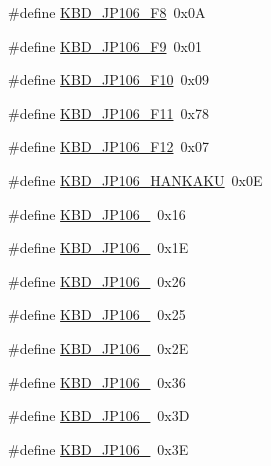 \begin{DoxyCompactItemize}
\#define \hyperlink{kbd__jp106_8h_a56d436aafc3b30bd31ae2c1a2b1284c3_a56d436aafc3b30bd31ae2c1a2b1284c3}{K\+B\+D\+\_\+\+J\+P106\+\_\+\+F8}~0x0\+A
\item 
\#define \hyperlink{kbd__jp106_8h_af0c3d489d82bbf3f7a94c64005be7173_af0c3d489d82bbf3f7a94c64005be7173}{K\+B\+D\+\_\+\+J\+P106\+\_\+\+F9}~0x01
\item 
\#define \hyperlink{kbd__jp106_8h_ae1756eb1df8f0f0cddf0336d4f5c13e1_ae1756eb1df8f0f0cddf0336d4f5c13e1}{K\+B\+D\+\_\+\+J\+P106\+\_\+\+F10}~0x09
\item 
\#define \hyperlink{kbd__jp106_8h_a21c7f7deb760c7d664826ab669cede83_a21c7f7deb760c7d664826ab669cede83}{K\+B\+D\+\_\+\+J\+P106\+\_\+\+F11}~0x78
\item 
\#define \hyperlink{kbd__jp106_8h_a94254f5ee6f39a27b36abbbe6750a62b_a94254f5ee6f39a27b36abbbe6750a62b}{K\+B\+D\+\_\+\+J\+P106\+\_\+\+F12}~0x07
\item 
\#define \hyperlink{kbd__jp106_8h_af3784ab94be3362b0e2397d4f763f594_af3784ab94be3362b0e2397d4f763f594}{K\+B\+D\+\_\+\+J\+P106\+\_\+\+H\+A\+N\+K\+A\+K\+U}~0x0\+E
\item 
\#define \hyperlink{kbd__jp106_8h_a05a4002954d7a01438fcc9a1299f918e_a05a4002954d7a01438fcc9a1299f918e}{K\+B\+D\+\_\+\+J\+P106\+\_}~0x16
\item 
\#define \hyperlink{kbd__jp106_8h_ab817e968a23ec0a30a5ae106d8757186_ab817e968a23ec0a30a5ae106d8757186}{K\+B\+D\+\_\+\+J\+P106\+\_}~0x1\+E
\item 
\#define \hyperlink{kbd__jp106_8h_aca357c793a32b0f46a09332671bc6c78_aca357c793a32b0f46a09332671bc6c78}{K\+B\+D\+\_\+\+J\+P106\+\_}~0x26
\item 
\#define \hyperlink{kbd__jp106_8h_a2abc310c1522ad2329a1642d0c8e2c61_a2abc310c1522ad2329a1642d0c8e2c61}{K\+B\+D\+\_\+\+J\+P106\+\_}~0x25
\item 
\#define \hyperlink{kbd__jp106_8h_aa8cd20b39be8d9e4a70d5808338a2f69_aa8cd20b39be8d9e4a70d5808338a2f69}{K\+B\+D\+\_\+\+J\+P106\+\_}~0x2\+E
\item 
\#define \hyperlink{kbd__jp106_8h_ac423c56dadb1185501a764585f9d9aaa_ac423c56dadb1185501a764585f9d9aaa}{K\+B\+D\+\_\+\+J\+P106\+\_}~0x36
\item 
\#define \hyperlink{kbd__jp106_8h_a810040b1313fbb323a172b1c204c3a8a_a810040b1313fbb323a172b1c204c3a8a}{K\+B\+D\+\_\+\+J\+P106\+\_}~0x3\+D
\item 
\#define \hyperlink{kbd__jp106_8h_a79b4c15c7a858644f368681a970017c1_a79b4c15c7a858644f368681a970017c1}{K\+B\+D\+\_\+\+J\+P106\+\_}~0x3\+E

\end{DoxyCompactItemize}
